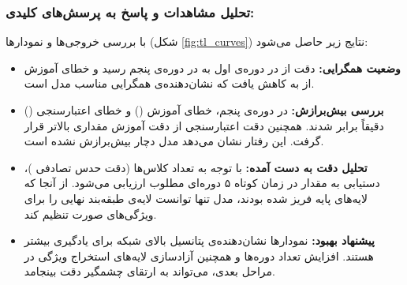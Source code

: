 \subsubsection*{تحلیل مشاهدات و پاسخ به پرسش‌های کلیدی:}
با بررسی خروجی‌ها و نمودارها (شکل \ref{fig:tl_curves}) نتایج زیر حاصل می‌شود:
\begin{itemize}
    \item \textbf{وضعیت همگرایی:} دقت از  در دوره‌ی اول به  در دوره‌ی پنجم رسید و خطای آموزش از  به  کاهش یافت که نشان‌دهنده‌ی همگرایی مناسب مدل است.
    \item \textbf{بررسی بیش‌برازش:} در دوره‌ی پنجم، خطای آموزش () و خطای اعتبارسنجی () دقیقاً برابر شدند. همچنین دقت اعتبارسنجی از دقت آموزش مقداری بالاتر قرار گرفت. این رفتار نشان می‌دهد مدل دچار بیش‌برازش  نشده است.
    \item \textbf{تحلیل دقت به دست آمده:} با توجه به تعداد کلاس‌ها (دقت حدس تصادفی )، دستیابی به مقدار  در زمان کوتاه ۵ دوره‌ای مطلوب ارزیابی می‌شود. از آنجا که لایه‌های پایه فریز شده بودند، مدل تنها توانست لایه‌ی طبقه‌بند نهایی را برای ویژگی‌های صورت تنظیم کند.
    \item \textbf{پیشنهاد بهبود:} نمودارها نشان‌دهنده‌ی پتانسیل بالای شبکه برای یادگیری بیشتر هستند. افزایش تعداد دوره‌ها و همچنین آزادسازی لایه‌های استخراج ویژگی در مراحل بعدی، می‌تواند به ارتقای چشمگیر دقت بینجامد.
\end{itemize}
